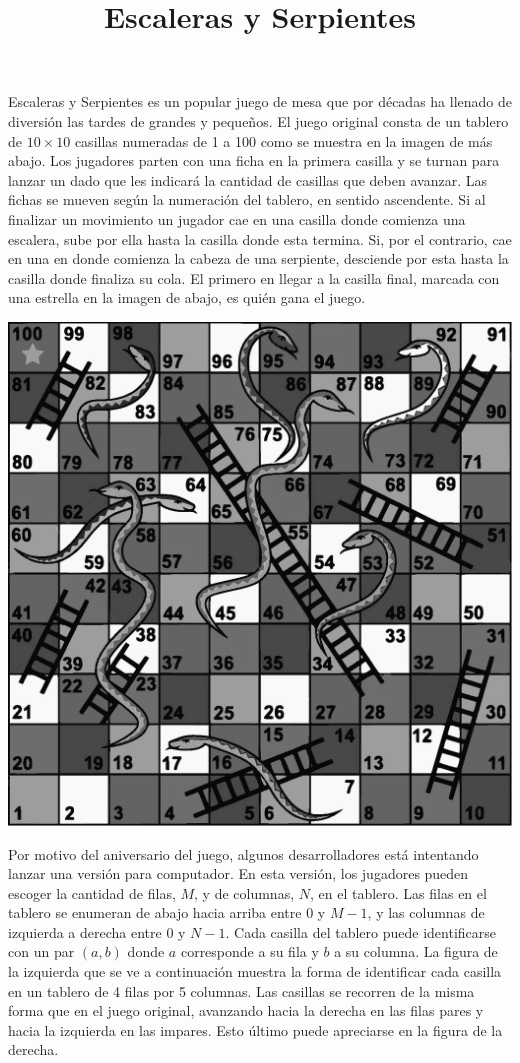 \documentclass{oci}
\title{Escaleras y Serpientes}
\begin{document}
\begin{problemDescription}
  Escaleras y Serpientes es un popular juego de mesa que por décadas ha
  llenado de diversión las tardes de grandes y pequeños.
  El juego original consta de un tablero de $10\times 10$ casillas numeradas de
  1 a 100 como se muestra en la imagen de más abajo.
  Los jugadores parten con una ficha en la primera casilla y se turnan para
  lanzar un dado que les indicará la cantidad de casillas que deben avanzar.
  Las fichas se mueven según la numeración del tablero, en sentido ascendente.
  Si al finalizar un movimiento un jugador cae en una casilla donde comienza una
  escalera, sube por ella hasta la casilla donde esta termina.
  Si, por el contrario, cae en una en donde comienza la cabeza de una serpiente,
  desciende por esta hasta la casilla donde finaliza su cola.
  El primero en llegar a la casilla final, marcada con una estrella en la
  imagen de abajo, es quién gana el juego.

  \begin{center}
  \includegraphics[scale=0.7]{tablero}
  \end{center}

  Por motivo del aniversario del juego, algunos desarrolladores está intentando
  lanzar una versión para computador.
  En esta versión, los jugadores pueden escoger la cantidad de filas, $M$, y de
  columnas, $N$, en el tablero.
  Las filas en el tablero se enumeran de abajo hacia arriba entre 0 y $M-1$, y
  las columnas de izquierda a derecha entre 0 y $N-1$.
  Cada casilla del tablero puede identificarse con un par $(a, b)$ donde $a$
  corresponde a su fila y $b$ a su columna.
  La figura de la izquierda que se ve a continuación muestra la forma de
  identificar cada casilla en un tablero de 4 filas por 5 columnas.
  Las casillas se recorren de la misma forma que en el juego original, avanzando
  hacia la derecha en las filas pares y hacia la izquierda en las impares.
  Esto último puede apreciarse en la figura de la derecha.


\end{problemDescription}
\end{document}
